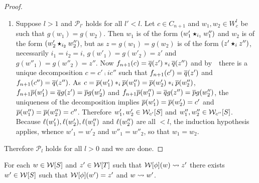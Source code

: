 \begin{proof}
\begin{enumerate}
\begin{enumerate}
      $\fid{x'}$ for some $x'\in C_n$ such that $f_n(x')=f_n(x)$. Now
      $\unit{n+1}(x)=\extend p(w_1)=c=\extend p(w_2)=\unit{n+1}(x')$
      so that $x=x'$ and $w_1=w_2$.
    \end{enumerate}
    \item Suppose $l>1$ and $\mathcal{P}_{l'}$ holds for all
      $l'<l$. Let $c\in C_{n+1}$ and $w_1,w_2\in W^l_c$ be such that
      $g(w_1)=g(w_2)$. Then $w_1$ is of the form $(w'_1\bm{\star}_{i_1}
      w''_1)$ and  $w_2$ is of the form $(w'_2\bm{\star}_{i_2} w''_2)$, but
      as $z=g(w_1)=g(w_2)$ is of the form $(z'\bm{\star}_{i} z'')$,
      necessarily $i_1=i_2=i$,
      $g(w'_1)=g(w'_2)=z'$ and $g(w''_1)=g(w''_2)=z''$. Now
      $f_{n+1}(c)=\overline{q}(z')\ast_{i} \overline{q}(z'')$ and by~\cndii\ there is a unique decomposition
      $c=c'\comp i c''$ such that $f_{n+1}(c')=\overline{q}(z')$ and
      $f_{n+1}(c'')=\overline{q}(z'')$. As $c=\overline{p}(w'_1)\ast_{i}\overline{p}(w''_1)=\overline{p}(w'_2)\ast_{i}\overline{p}(w''_2)$,
      $f_{n+1}\overline{p}(w'_1)=\overline{q}g(z')=\overline{p}g(w'_2)$ and
      $f_{n+1}\overline{p}(w''_1)=\overline{q}g(z'')=\overline{p}g(w''_2)$, the
      uniqueness of the decomposition implies $\overline{p}
      (w'_1)=\overline{p}(w'_2)=c'$ and  $\overline{p}(w''_1)=\overline{p}(w''_2)=c''$.
Therefore $w'_1,w'_2\in \mathcal{W}_{c'}[S]$ and $w''_1,w''_2\in \mathcal{W}_{c''}[S]$. Because $\ell(w'_1),\ell(w'_2),\ell(w''_1)$ and $\ell(w''_2)$
are all $<l$, the induction hypothesis applies, whence 
      $w'_1=w'_2$ and $w''_1=w''_2$, so that $w_1=w_2$.
    \end{enumerate}
 Therefore  $\mathcal{P}_l$ holds for all $l>0$ and we are done.  
 \end{proof}
\begin{lemma}\label{lemma:forward_lift_frel}
 For each $w\in \mathcal{W}[S]$ and $z'\in\mathcal{W}[T]$ such that $\mathcal{W}[\phi](w)\leadsto z'$ there exists $w'\in\mathcal{W}[S]$ such
 that $\mathcal{W}[\phi](w')=z'$ and $w\leadsto w'$.
\end{lemma}
